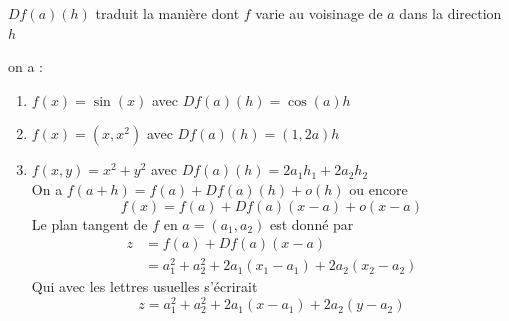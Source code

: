          \begin{remarque}
             $Df(a)(h)$ traduit la manière dont $f$ varie au voisinage de $a$ dans la direction $h$
         \end{remarque}
         \begin{exemple}
             on a :
             \begin{enumerate}
                 \item $f(x)=\sin(x)$ avec $Df(a)(h)=\cos(a)h$
                 \item $f(x)=(x,x^2)$ avec $Df(a)(h)=(1,2a)h$
                 \item $f(x,y)=x^2+y^2$ avec $Df(a)(h)= 2a_1h_1+2a_2h_2$\\
                 On a $f(a+h)=f(a)+Df(a)(h)+o(h)$ ou encore 
                 \begin{equation*}
                     f(x)=f(a)+Df(a)(x-a)+o(x-a)
                 \end{equation*}
                 Le plan tangent de $f$ en $a=(a_1,a_2)$ est donné par 
                 \begin{align*}
                     z&=f(a)+Df(a)(x-a)\\
                     &=a_1^2+a_2^2+2a_1(x_1-a_1)+2a_2(x_2-a_2)
                 \end{align*}
                 Qui avec les lettres usuelles s'écrirait
                 \begin{equation*}
                     z = a_1^2+a_2^2+2a_1(x-a_1)+2a_2(y-a_2)
                 \end{equation*}
             \end{enumerate}
         \end{exemple}
